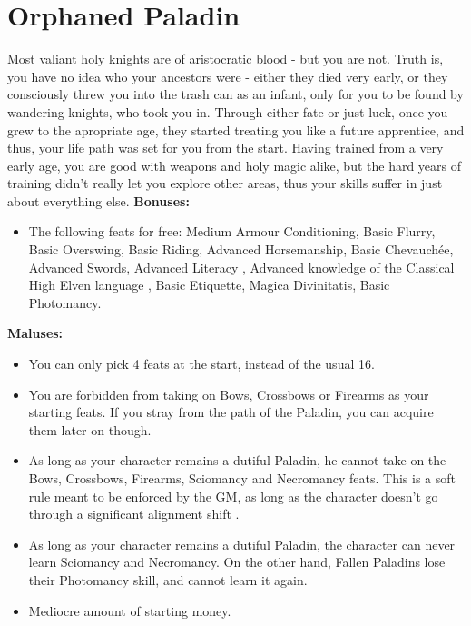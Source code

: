 \section{Orphaned Paladin}
Most valiant holy knights are of aristocratic blood - but you are not. Truth is, you have no idea who your ancestors were - either they died very early, or they consciously threw you into the trash can as an infant, only for you to be found by wandering knights, who took you in. Through either fate or just luck, once you grew to the apropriate age, they started treating you like a future apprentice, and thus, your life path was set for you from the start. Having trained from a very early age, you are good with weapons and holy magic alike, but the hard years of training didn't really let you explore other areas, thus your skills suffer in just about everything else.\newline
\textbf{Bonuses:}
\begin{itemize}
	\item The following feats for free: Medium Armour Conditioning, Basic Flurry, Basic Overswing, Basic Riding, Advanced Horsemanship, Basic Chevauchée, Advanced Swords, Advanced Literacy , Advanced knowledge of the Classical High Elven language , Basic Etiquette, Magica Divinitatis, Basic Photomancy.
\end{itemize}
\textbf{Maluses:}
\begin{itemize}
	\item You can only pick 4 feats at the start, instead of the usual 16.
	\item You are forbidden from taking on Bows, Crossbows or Firearms as your starting feats. If you stray from the path of the Paladin, you can acquire them later on though.
	\item As long as your character remains a dutiful Paladin, he cannot take on the Bows, Crossbows, Firearms, Sciomancy and Necromancy feats. This is a soft rule meant to be enforced by the GM, as long as the character doesn't go through a significant alignment shift .
	\item As long as your character remains a dutiful Paladin, the character can never learn Sciomancy and Necromancy. On the other hand, Fallen Paladins lose their Photomancy skill, and cannot learn it again.
	\item Mediocre amount of starting money.
\end{itemize}
